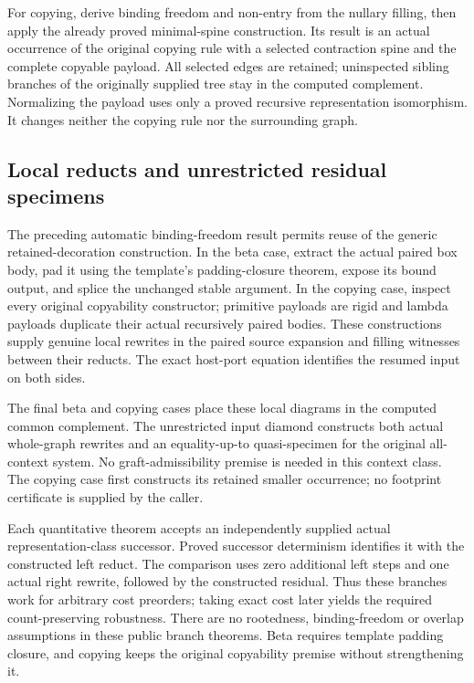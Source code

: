 For copying, derive binding freedom and non-entry from the nullary filling,
then apply the already proved minimal-spine construction. Its result is an
actual occurrence of the original copying rule with a selected contraction
spine and the complete copyable payload. All selected edges are retained;
uninspected sibling branches of the originally supplied tree stay in the
computed complement. Normalizing the payload uses only a proved recursive
representation isomorphism. It changes neither the copying rule nor the
surrounding graph.

\subsection{Local reducts and unrestricted residual specimens}
The preceding automatic binding-freedom result permits reuse of the generic
retained-decoration construction. In the beta case, extract the actual
paired box body, pad it using the template's padding-closure theorem, expose
its bound output, and splice the unchanged stable argument. In the copying
case, inspect every original copyability constructor; primitive payloads
are rigid and lambda payloads duplicate their actual recursively paired
bodies. These constructions supply genuine local rewrites in the paired
source expansion and filling witnesses between their reducts. The exact
host-port equation identifies the resumed input on both sides.

The final beta and copying cases place these local diagrams in the computed
common complement. The unrestricted input diamond constructs both actual
whole-graph rewrites and an equality-up-to quasi-specimen for the original
all-context system. No graft-admissibility premise is needed in this context
class. The copying case first constructs its retained smaller occurrence;
no footprint certificate is supplied by the caller.

Each quantitative theorem accepts an independently supplied actual
representation-class successor. Proved successor determinism identifies it
with the constructed left reduct. The comparison uses zero additional left
steps and one actual right rewrite, followed by the constructed residual.
Thus these branches work for arbitrary cost preorders; taking exact cost
later yields the required count-preserving robustness. There are no
rootedness, binding-freedom or overlap assumptions in these public branch
theorems. Beta requires template padding closure, and copying keeps the
original copyability premise without strengthening it.

